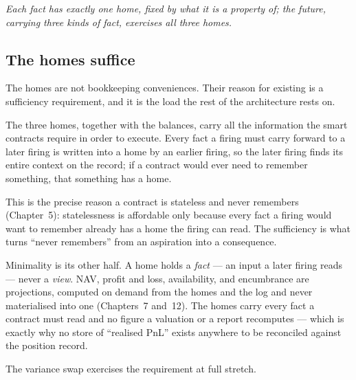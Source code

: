 \emph{Each fact has exactly one home, fixed by what it is a property of; the future,
carrying three kinds of fact, exercises all three homes.}

\subsection{The homes suffice}

The homes are not bookkeeping conveniences. Their reason for existing is a sufficiency
requirement, and it is the load the rest of the architecture rests on.

\begin{principle}\label{prin:sufficiency}
The three homes, together with the balances, carry all the information the smart contracts
require in order to execute. Every fact a firing must carry forward to a later firing is
written into a home by an earlier firing, so the later firing finds its entire context on
the record; if a contract would ever need to remember something, that something has a
home.
\end{principle}

This is the precise reason a contract is stateless and never remembers
(Chapter~5): statelessness is affordable only because every fact a firing
would want to remember already has a home the firing can read. The sufficiency is what
turns ``never remembers'' from an aspiration into a consequence.

Minimality is its other half. A home holds a \emph{fact} --- an input a later firing reads
--- never a \emph{view}. NAV, profit and loss, availability, and encumbrance are
projections, computed on demand from the homes and the log and never materialised into one
(Chapters~7 and~12). The homes carry every fact a contract
must read and no figure a valuation or a report recomputes --- which is exactly why no
store of ``realised PnL'' exists anywhere to be reconciled against the position record.

The variance swap exercises the requirement at full stretch.

